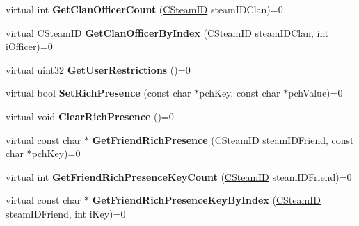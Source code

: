 \begin{DoxyCompactItemize}
\item 
\mbox{\label{class_i_steam_friends_a7ff70728ac9a7d20ec96dc27255a7cd9}} 
virtual int {\bfseries Get\+Clan\+Officer\+Count} (\hyperlink{class_c_steam_i_d}{C\+Steam\+ID} steam\+I\+D\+Clan)=0
\item 
\mbox{\label{class_i_steam_friends_a79bf6ec72ccc6209a73c81755735ce8c}} 
virtual \hyperlink{class_c_steam_i_d}{C\+Steam\+ID} {\bfseries Get\+Clan\+Officer\+By\+Index} (\hyperlink{class_c_steam_i_d}{C\+Steam\+ID} steam\+I\+D\+Clan, int i\+Officer)=0
\item 
\mbox{\label{class_i_steam_friends_af4146ae496bb10eb92e13c198dfffb39}} 
virtual uint32 {\bfseries Get\+User\+Restrictions} ()=0
\item 
\mbox{\label{class_i_steam_friends_a07752feeb6241be20afa797b7c1be1c2}} 
virtual bool {\bfseries Set\+Rich\+Presence} (const char $\ast$pch\+Key, const char $\ast$pch\+Value)=0
\item 
\mbox{\label{class_i_steam_friends_a54dac8e99746df4d7e84d12e5c5216d5}} 
virtual void {\bfseries Clear\+Rich\+Presence} ()=0
\item 
\mbox{\label{class_i_steam_friends_a899948624d194f9941393910d85568dd}} 
virtual const char $\ast$ {\bfseries Get\+Friend\+Rich\+Presence} (\hyperlink{class_c_steam_i_d}{C\+Steam\+ID} steam\+I\+D\+Friend, const char $\ast$pch\+Key)=0
\item 
\mbox{\label{class_i_steam_friends_a5ec526f9066bdf9a81dce11b449f7476}} 
virtual int {\bfseries Get\+Friend\+Rich\+Presence\+Key\+Count} (\hyperlink{class_c_steam_i_d}{C\+Steam\+ID} steam\+I\+D\+Friend)=0
\item 
\mbox{\label{class_i_steam_friends_a62314a0684def333acdab19bf88e1ff5}} 
virtual const char $\ast$ {\bfseries Get\+Friend\+Rich\+Presence\+Key\+By\+Index} (\hyperlink{class_c_steam_i_d}{C\+Steam\+ID} steam\+I\+D\+Friend, int i\+Key)=0
\item 
\mbox{\label{class_i_steam_friends_a1812fcaa2a5a567c241aa5c20daab530}} 

\end{DoxyCompactItemize}
